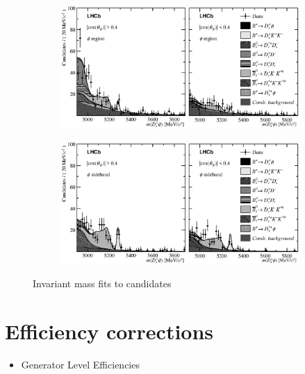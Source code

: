\begin{figure}[!h]
    \centering
    \begin{subfigure}[t]{1.0\textwidth}
        \includegraphics[width=1.0\textwidth]{figs/B2DsPhi/Fig4a.eps}
    \end{subfigure}
    \begin{subfigure}[t]{1.0\textwidth}
        \includegraphics[width=1.0\textwidth]{figs/B2DsPhi/Fig4b.eps}
    \end{subfigure}
    \caption{Invariant mass fits to \decay{\Bp}{\Dsp\phiz} candidates}
\end{figure}



\section{Efficiency corrections}
\label{sec:B2DsPhi_effcorrections}


\begin{itemize}
\item Generator Level Efficiencies
\end{itemize}

